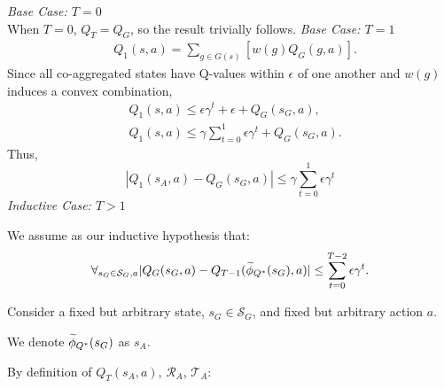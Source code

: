 \textit{Base Case: $T = 0$}\\
When $T = 0$, $Q_T = Q_G$, so the result trivially follows.
\textit{Base Case: $T = 1$}\\
\begin{align*}
&Q_1(s,a) = \underset{g \in G(s)}{\sum} \left[ w(g)Q_G(g,a) \right].
\end{align*}
Since all co-aggregated states have Q-values within $\epsilon$ of one another and $w(g)$ induces a convex combination,
\begin{align*}
&Q_1(s,a) \leq \epsilon \gamma^t + \epsilon + Q_G(s_G, a),\\
&Q_1(s,a) \leq \gamma\sum_{t=0}^{1} \epsilon \gamma^t + Q_G(s_G, a).
\end{align*}
Thus,
\begin{equation}
\left| Q_{1}(s_A, a) - Q_G(s_G,a) \right| \leq \gamma\sum_{t=0}^{1}\epsilon \gamma^t
\end{equation}
\textit{Inductive Case: $T > 1$}

We assume as our inductive hypothesis that:
\begin{equation}
\forall_{s_G \in \mathcal{S}_G, a} |Q_G(s_G, a) - Q_{T-1}(\widetilde \phi_{Q^*}(s_G), a)| \leq \sum_{t=0}^{T-2} \epsilon \gamma^t.\\
\end{equation}

Consider a fixed but arbitrary state, $s_G \in \mathcal{S}_G$, and fixed but arbitrary action $a$.

We denote $\widetilde \phi_{Q^*}(s_G)$ as $s_A$. 

By definition of $Q_{T}(s_A, a)$, $\mathcal{R}_A$, $\mathcal{T}_A$:

